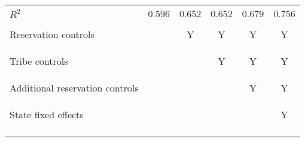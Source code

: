 \begin{center}
\begin{tabular}{lccccc}
\noalign{\smallskip}$ R^2$ & 0.596 & 0.652 & 0.652 & 0.679 & 0.756\\
 & \begin{footnotesize}\end{footnotesize} & \begin{footnotesize}\end{footnotesize} & \begin{footnotesize}\end{footnotesize} & \begin{footnotesize}\end{footnotesize} & \begin{footnotesize}\end{footnotesize}\\
\noalign{\smallskip}Reservation controls &  & Y & Y & Y & Y\\
Tribe controls & \begin{footnotesize}\end{footnotesize} & \begin{footnotesize}\end{footnotesize} & \begin{footnotesize}Y\end{footnotesize} & \begin{footnotesize}Y\end{footnotesize} & \begin{footnotesize}Y\end{footnotesize}\\
Additional reservation controls &  &  &  & Y & Y\\
State fixed effects & \begin{footnotesize}\end{footnotesize} & \begin{footnotesize}\end{footnotesize} & \begin{footnotesize}\end{footnotesize} & \begin{footnotesize}\end{footnotesize} & \begin{footnotesize}Y\end{footnotesize}\\
\noalign{\smallskip}\hline\end{tabular}\\
\end{center}
